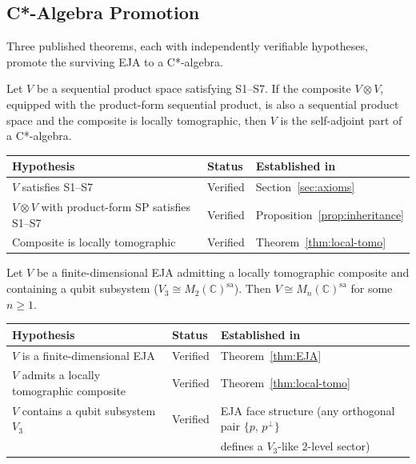 \subsection{C*-Algebra Promotion}\label{subsec:cstar}

Three published theorems, each with independently verifiable hypotheses,
promote the surviving EJA to a C*-algebra.

\begin{theorem}\label{thm:vdW3}
Let $V$ be a sequential product space satisfying S1--S7. If the
composite $V\otimes V$, equipped with the product-form sequential
product, is also a sequential product space and the composite is locally
tomographic, then $V$ is the self-adjoint part of a C*-algebra.
\end{theorem}

\begin{center}
\begin{tabular}{lll}
\toprule
\textbf{Hypothesis} & \textbf{Status} & \textbf{Established in} \\
\midrule
$V$ satisfies S1--S7
  & Verified & Section~\ref{sec:axioms} \\
$V\otimes V$ with product-form SP satisfies S1--S7
  & Verified & Proposition~\ref{prop:inheritance} \\
Composite is locally tomographic
  & Verified & Theorem~\ref{thm:local-tomo} \\
\bottomrule
\end{tabular}
\end{center}

\begin{theorem}\label{thm:BW}
Let $V$ be a finite-dimensional EJA admitting a locally tomographic
composite and containing a qubit subsystem ($V_3 \cong
M_2(\mathbb{C})^{\mathrm{sa}}$). Then $V \cong
M_n(\mathbb{C})^{\mathrm{sa}}$ for some $n \ge 1$.
\end{theorem}

\begin{center}
\begin{tabular}{lll}
\toprule
\textbf{Hypothesis} & \textbf{Status} & \textbf{Established in} \\
\midrule
$V$ is a finite-dimensional EJA
  & Verified & Theorem~\ref{thm:EJA} \\
$V$ admits a locally tomographic composite
  & Verified & Theorem~\ref{thm:local-tomo} \\
$V$ contains a qubit subsystem $V_3$
  & Verified & EJA face structure
  (any orthogonal pair $\{p,\,p^\perp\}$ \\
  & & defines a $V_3$-like 2-level sector) \\
\bottomrule
\end{tabular}
\end{center}

